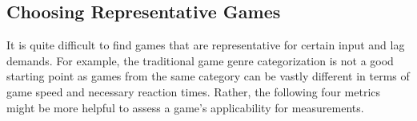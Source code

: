 \subsection{Choosing Representative Games}
\label{sec:game-criteria}


It is quite difficult to find games that are representative for certain 
input and lag demands. For example, the traditional game genre 
categorization is not a good starting point as games from the same 
category can be vastly different in terms of game speed and necessary 
reaction times. Rather, the following four metrics might be more 
helpful to assess a game's applicability for measurements.

